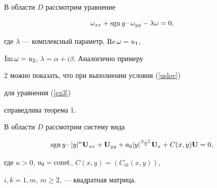 \begin{exam}


В области $D$ рассмотрим уравнение


\begin{equation}\label{ex3}


\omega_{xx}+\sgn y\cdot\omega_{yy}-\lambda \omega = 0,


\end{equation}


где $\lambda$ --- комплексный параметр, $\operatorname{Re}\omega=u_1$,


$\operatorname{Im}\omega=u_2$, $\lambda=\alpha+i\beta$. Аналогично примеру


2 можно показать, что при выполнении условия (\ref{uslov})


для уравнения (\ref{ex3})


справедлива теорема 1.


\end{exam}





\begin{exam}


В области $D$ рассмотрим систему вида


\begin{equation}\label{ex4}


\sgn y \cdot| y |^n {\bold U}_{xx}+{\bold


U}_{yy}+a_0|y|^{\frac{n-1}{2}}{\bold U}_x+C(x,y){\bold U}=0,


\end{equation}


где $n>0$, $a_0=\operatorname{const}$, $C(x,y)=(C_{ik}(x,y))$,


$i,k=\overline{1,m}$, $m\ge 2$, --- квадратная матрица.


\end{exam}





